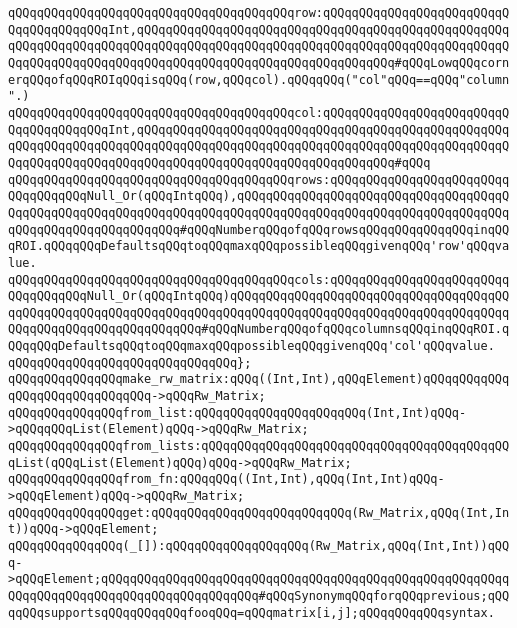 \verb|qQQqqQQqqQQqqQQqqQQqqQQqqQQqqQQqqQQqqQQqrow:qQQqqQQqqQQqqQQqqQQqqQQqqQQqqQQqqQQqqQQqInt,qQQqqQQqqQQqqQQqqQQqqQQqqQQqqQQqqQQqqQQqqQQqqQQqqQQqqQQqqQQqqQQqqQQqqQQqqQQqqQQqqQQqqQQqqQQqqQQqqQQqqQQqqQQqqQQqqQQqqQQqqQQqqQQqqQQqqQQqqQQqqQQqqQQqqQQqqQQqqQQqqQQqqQQqqQQqqQQq#qQQqLowqQQqcornerqQQqofqQQqROIqQQqisqQQq(row,qQQqcol).qQQqqQQq("col"qQQq==qQQq"column".)|\newline
\verb|qQQqqQQqqQQqqQQqqQQqqQQqqQQqqQQqqQQqqQQqcol:qQQqqQQqqQQqqQQqqQQqqQQqqQQqqQQqqQQqqQQqInt,qQQqqQQqqQQqqQQqqQQqqQQqqQQqqQQqqQQqqQQqqQQqqQQqqQQqqQQqqQQqqQQqqQQqqQQqqQQqqQQqqQQqqQQqqQQqqQQqqQQqqQQqqQQqqQQqqQQqqQQqqQQqqQQqqQQqqQQqqQQqqQQqqQQqqQQqqQQqqQQqqQQqqQQqqQQqqQQq#qQQq|\newline
\verb|qQQqqQQqqQQqqQQqqQQqqQQqqQQqqQQqqQQqqQQqrows:qQQqqQQqqQQqqQQqqQQqqQQqqQQqqQQqqQQqNull_Or(qQQqIntqQQq),qQQqqQQqqQQqqQQqqQQqqQQqqQQqqQQqqQQqqQQqqQQqqQQqqQQqqQQqqQQqqQQqqQQqqQQqqQQqqQQqqQQqqQQqqQQqqQQqqQQqqQQqqQQqqQQqqQQqqQQqqQQqqQQqqQQq#qQQqNumberqQQqofqQQqrowsqQQqqQQqqQQqqQQqinqQQqROI.qQQqqQQqDefaultsqQQqtoqQQqmaxqQQqpossibleqQQqgivenqQQq'row'qQQqvalue.|\newline
\verb|qQQqqQQqqQQqqQQqqQQqqQQqqQQqqQQqqQQqqQQqcols:qQQqqQQqqQQqqQQqqQQqqQQqqQQqqQQqqQQqNull_Or(qQQqIntqQQq)qQQqqQQqqQQqqQQqqQQqqQQqqQQqqQQqqQQqqQQqqQQqqQQqqQQqqQQqqQQqqQQqqQQqqQQqqQQqqQQqqQQqqQQqqQQqqQQqqQQqqQQqqQQqqQQqqQQqqQQqqQQqqQQqqQQqqQQq#qQQqNumberqQQqofqQQqcolumnsqQQqinqQQqROI.qQQqqQQqDefaultsqQQqtoqQQqmaxqQQqpossibleqQQqgivenqQQq'col'qQQqvalue.|\newline
\verb|qQQqqQQqqQQqqQQqqQQqqQQqqQQqqQQq};|\newline
\newline
\verb|qQQqqQQqqQQqqQQqmake_rw_matrix:qQQq((Int,Int),qQQqElement)qQQqqQQqqQQqqQQqqQQqqQQqqQQqqQQq->qQQqRw_Matrix;|\newline
\verb|qQQqqQQqqQQqqQQqfrom_list:qQQqqQQqqQQqqQQqqQQqqQQq(Int,Int)qQQq->qQQqqQQqList(Element)qQQq->qQQqRw_Matrix;|\newline
\verb|qQQqqQQqqQQqqQQqfrom_lists:qQQqqQQqqQQqqQQqqQQqqQQqqQQqqQQqqQQqqQQqqQQqList(qQQqList(Element)qQQq)qQQq->qQQqRw_Matrix;|\newline
\verb|qQQqqQQqqQQqqQQqfrom_fn:qQQqqQQq((Int,Int),qQQq(Int,Int)qQQq->qQQqElement)qQQq->qQQqRw_Matrix;|\newline
\newline
\verb|qQQqqQQqqQQqqQQqget:qQQqqQQqqQQqqQQqqQQqqQQqqQQq(Rw_Matrix,qQQq(Int,Int))qQQq->qQQqElement;|\newline
\verb|qQQqqQQqqQQqqQQq(_[]):qQQqqQQqqQQqqQQqqQQq(Rw_Matrix,qQQq(Int,Int))qQQq->qQQqElement;qQQqqQQqqQQqqQQqqQQqqQQqqQQqqQQqqQQqqQQqqQQqqQQqqQQqqQQqqQQqqQQqqQQqqQQqqQQqqQQqqQQqqQQqqQQq#qQQqSynonymqQQqforqQQqprevious;qQQqqQQqsupportsqQQqqQQqqQQqfooqQQq=qQQqmatrix[i,j];qQQqqQQqqQQqsyntax.|\newline
